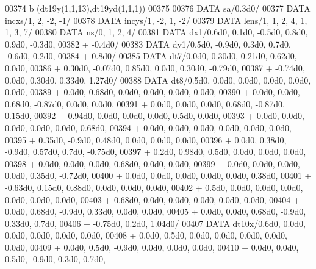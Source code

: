 \begin{DoxyCode}
00374      b   (dt19y(1,1,13),dt19yd(1,1,1))
00375 
00376       \textcolor{keyword}{DATA}              sa/0.3d0/
00377       \textcolor{keyword}{DATA}              incxs/1, 2, -2, -1/
00378       \textcolor{keyword}{DATA}              incys/1, -2, 1, -2/
00379       \textcolor{keyword}{DATA}              lens/1, 1, 2, 4, 1, 1, 3, 7/
00380       \textcolor{keyword}{DATA}              ns/0, 1, 2, 4/
00381       \textcolor{keyword}{DATA}              dx1/0.6d0, 0.1d0, -0.5d0, 0.8d0, 0.9d0, -0.3d0,
00382      +                  -0.4d0/
00383       \textcolor{keyword}{DATA}              dy1/0.5d0, -0.9d0, 0.3d0, 0.7d0, -0.6d0, 0.2d0,
00384      +                  0.8d0/
00385       \textcolor{keyword}{DATA}              dt7/0.0d0, 0.30d0, 0.21d0, 0.62d0, 0.0d0,
00386      +                  0.30d0, -0.07d0, 0.85d0, 0.0d0, 0.30d0, -0.79d0,
00387      +                  -0.74d0, 0.0d0, 0.30d0, 0.33d0, 1.27d0/
00388       \textcolor{keyword}{DATA}              dt8/0.5d0, 0.0d0, 0.0d0, 0.0d0, 0.0d0, 0.0d0,
00389      +                  0.0d0, 0.68d0, 0.0d0, 0.0d0, 0.0d0, 0.0d0,
00390      +                  0.0d0, 0.0d0, 0.68d0, -0.87d0, 0.0d0, 0.0d0,
00391      +                  0.0d0, 0.0d0, 0.0d0, 0.68d0, -0.87d0, 0.15d0,
00392      +                  0.94d0, 0.0d0, 0.0d0, 0.0d0, 0.5d0, 0.0d0,
00393      +                  0.0d0, 0.0d0, 0.0d0, 0.0d0, 0.0d0, 0.68d0,
00394      +                  0.0d0, 0.0d0, 0.0d0, 0.0d0, 0.0d0, 0.0d0,
00395      +                  0.35d0, -0.9d0, 0.48d0, 0.0d0, 0.0d0, 0.0d0,
00396      +                  0.0d0, 0.38d0, -0.9d0, 0.57d0, 0.7d0, -0.75d0,
00397      +                  0.2d0, 0.98d0, 0.5d0, 0.0d0, 0.0d0, 0.0d0,
00398      +                  0.0d0, 0.0d0, 0.0d0, 0.68d0, 0.0d0, 0.0d0,
00399      +                  0.0d0, 0.0d0, 0.0d0, 0.0d0, 0.35d0, -0.72d0,
00400      +                  0.0d0, 0.0d0, 0.0d0, 0.0d0, 0.0d0, 0.38d0,
00401      +                  -0.63d0, 0.15d0, 0.88d0, 0.0d0, 0.0d0, 0.0d0,
00402      +                  0.5d0, 0.0d0, 0.0d0, 0.0d0, 0.0d0, 0.0d0, 0.0d0,
00403      +                  0.68d0, 0.0d0, 0.0d0, 0.0d0, 0.0d0, 0.0d0,
00404      +                  0.0d0, 0.68d0, -0.9d0, 0.33d0, 0.0d0, 0.0d0,
00405      +                  0.0d0, 0.0d0, 0.68d0, -0.9d0, 0.33d0, 0.7d0,
00406      +                  -0.75d0, 0.2d0, 1.04d0/
00407       \textcolor{keyword}{DATA}              dt10x/0.6d0, 0.0d0, 0.0d0, 0.0d0, 0.0d0, 0.0d0,
00408      +                  0.0d0, 0.5d0, 0.0d0, 0.0d0, 0.0d0, 0.0d0, 0.0d0,
00409      +                  0.0d0, 0.5d0, -0.9d0, 0.0d0, 0.0d0, 0.0d0,
00410      +                  0.0d0, 0.0d0, 0.5d0, -0.9d0, 0.3d0, 0.7d0,

\end{DoxyCode}
